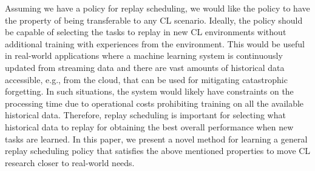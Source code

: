Assuming we have a policy for replay scheduling, we would like the policy to have the property of being transferable to any CL scenario. Ideally, the policy should be capable of selecting the tasks to replay in new CL environments without additional training with experiences from the environment. This would be useful in real-world applications where a machine learning system is continuously updated from streaming data and there are vast amounts of historical data accessible, e.g., from the cloud, that can be used for mitigating catastrophic forgetting.
In such situations, the system would likely have constraints on the processing time due to operational costs prohibiting training on all the available historical data. Therefore, replay scheduling is important for selecting what historical data to replay for obtaining the best overall performance when new tasks are learned. In this paper, we present a novel method for learning a general replay scheduling policy that satisfies the above mentioned properties to move CL research closer to real-world needs.



